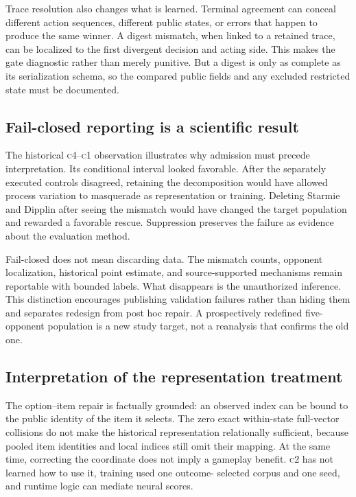 \documentclass[aps,reprint,superscriptaddress,longbibliography,floatfix]{revtex4-2}
\newcommand{\COne}{\textsc{c1}}
\newcommand{\CTwo}{\textsc{c2}}
\newcommand{\CFour}{\textsc{c4}}
\begin{document}
Trace resolution also changes what is learned.  Terminal agreement can conceal
different action sequences, different public states, or errors that happen to
produce the same winner.  A digest mismatch, when linked to a retained trace,
can be localized to the first divergent decision and acting side.  This makes
the gate diagnostic rather than merely punitive.  But a digest is only as
complete as its serialization schema, so the compared public fields and any
excluded restricted state must be documented.

\subsection{Fail-closed reporting is a scientific result}

The historical \CFour--\COne{} observation illustrates why admission must
precede interpretation.  Its conditional interval looked favorable.  After
the separately executed controls disagreed, retaining the decomposition would
have allowed process variation to masquerade as representation or training.
Deleting Starmie and Dipplin after seeing the mismatch would have changed the
target population and rewarded a favorable rescue.  Suppression preserves the
failure as evidence about the evaluation method.

Fail-closed does not mean discarding data.  The mismatch counts, opponent
localization, historical point estimate, and source-supported mechanisms remain
reportable with bounded labels.  What disappears is the unauthorized inference.
This distinction encourages publishing validation failures rather than hiding
them and separates redesign from post hoc repair.  A prospectively redefined
five-opponent population is a new study target, not a reanalysis that confirms
the old one.

\subsection{Interpretation of the representation treatment}

The option--item repair is factually grounded: an observed index can be bound to
the public identity of the item it selects.  The zero exact within-state
full-vector collisions do not make the historical representation relationally
sufficient, because pooled item identities and local indices still omit their
mapping.  At the same time, correcting the coordinate does not imply a gameplay
benefit.  \CTwo{} has not learned how to use it, training used one outcome-
selected corpus and one seed, and runtime logic can mediate neural scores.
\end{document}

